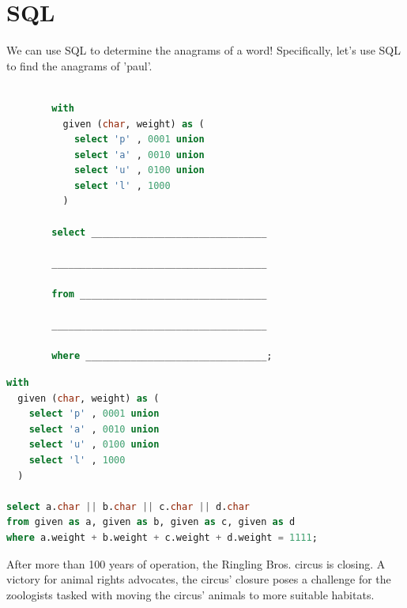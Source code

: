 \documentclass{exam}
\begin{document}

\section{SQL}
\begin{questions}

\item We can use SQL to determine the anagrams of a word! Specifically, let’s use SQL to find the anagrams of 'paul'.

\begin{lstlisting}[language=SQL]

        with
          given (char, weight) as (
            select 'p' , 0001 union
            select 'a' , 0010 union
            select 'u' , 0100 union
            select 'l' , 1000
          )

        select _______________________________ 

        ______________________________________

        from _________________________________ 

        ______________________________________ 

        where ________________________________;

\end{lstlisting}

\begin{solution}
\begin{lstlisting}[language=SQL]
with
  given (char, weight) as (
    select 'p' , 0001 union
    select 'a' , 0010 union
    select 'u' , 0100 union
    select 'l' , 1000
  )

select a.char || b.char || c.char || d.char 
from given as a, given as b, given as c, given as d 
where a.weight + b.weight + c.weight + d.weight = 1111;
\end{lstlisting}
\end{solution}

\clearpage

\item After more than 100 years of operation, the Ringling Bros. circus is closing.  A victory for animal rights advocates, the circus’ closure poses a challenge for the zoologists tasked with moving the circus’ animals to more suitable habitats.
 

\end{questions}
\end{document}
